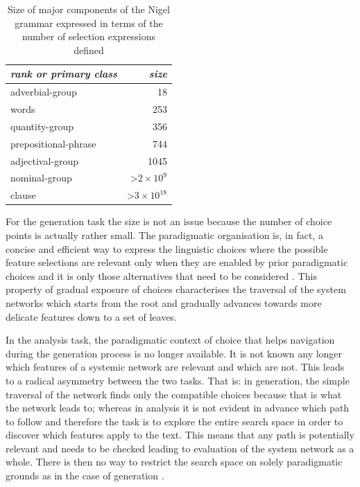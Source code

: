 \begin{table}[!ht]
    \centering
    \begin{tabular}{|l|r|}
        \hline
        \textit{rank or primary class} & \textit{size}                             \\ \hline
        adverbial-group                & 18                                        \\ \hline
        words                          & 253                                       \\ \hline
        quantity-group                 & 356                                       \\ \hline
        prepositional-phrase           & 744                                       \\ \hline
        adjectival-group               & 1045                                      \\ \hline
        nominal-group                  & \textgreater $ 2\times 10^{9} $  \\ \hline
        clause                         & \textgreater $ 3\times 10^{18} $ \\ \hline
    \end{tabular}
    \caption{Size of major components of the Nigel grammar expressed in terms of the number of selection expressions defined \citep[35]{Bateman2008}}
    \label{tab:size}
\end{table}

For the generation task the size is not an issue because the number of choice points is actually rather small. The paradigmatic organisation is, in fact, a concise and efficient way to express the linguistic choices where the possible feature selections are relevant only when they are enabled by prior paradigmatic choices and it is only those alternatives that need to be considered \citep[12--13]{Halliday96-grammatics}. This property of gradual exposure of choices characterises the traversal of the system networks which starts from the root and gradually advances towards more delicate features down to a set of leaves.

In the analysis task, the paradigmatic context of choice that helps navigation during the generation process is no longer available. It is not known any longer which features of a systemic network are relevant and which are not. This leads to a radical asymmetry between the two tasks. That is: in generation, the simple traversal of the network finds only the compatible choices because that is what the network leads to; whereas in analysis it is not evident in advance which path to follow and therefore the task is to explore the entire search space in order to discover which features apply to the text. This means that any path is potentially relevant and needs to be checked leading to evaluation of the system network as a whole. There is then no way to restrict the search space on solely paradigmatic grounds as in the case of generation \citep[29]{Bateman2008}.

